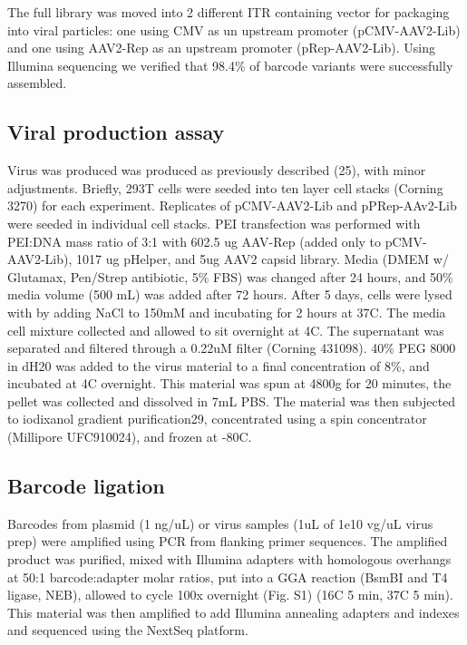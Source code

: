 The full library was moved into 2 different ITR containing vector for packaging into viral particles: one using CMV as un upstream promoter (pCMV-AAV2-Lib) and one using AAV2-Rep as an upstream promoter (pRep-AAV2-Lib). Using Illumina sequencing we verified that 98.4\% of barcode variants were successfully assembled.

\subsection{Viral production assay}
Virus was produced was produced as previously described (25), with minor adjustments. Briefly, 293T cells were seeded into ten layer cell stacks (Corning 3270) for each experiment. Replicates of pCMV-AAV2-Lib and pPRep-AAv2-Lib were seeded in individual cell stacks. PEI transfection was performed with PEI:DNA mass ratio of 3:1 with 602.5 ug AAV-Rep (added only to pCMV-AAV2-Lib), 1017 ug pHelper, and 5ug AAV2 capsid library. Media (DMEM w/ Glutamax, Pen/Strep antibiotic, 5\% FBS) was changed after 24 hours, and 50\% media volume (500 mL) was added after 72 hours. After 5 days, cells were lysed with by adding NaCl to 150mM and incubating for 2 hours at 37C. The media cell mixture collected and allowed to sit overnight at 4C. The supernatant was separated and filtered through a 0.22uM filter (Corning 431098). 40\% PEG 8000 in dH20 was added to the virus material to a final concentration of 8\%, and incubated at 4C overnight. This material was spun at 4800g for 20 minutes, the pellet was collected and dissolved in 7mL PBS. The material was then subjected to iodixanol gradient purification29, concentrated using a spin concentrator (Millipore UFC910024), and frozen at -80C. 

\subsection{Barcode ligation}
Barcodes from plasmid (1 ng/uL) or virus samples (1uL of 1e10 vg/uL virus prep) were amplified using PCR from flanking primer sequences. The amplified product was purified, mixed with Illumina adapters with homologous overhangs at 50:1 barcode:adapter molar ratios, put into a GGA reaction (BsmBI and T4 ligase, NEB), allowed to cycle 100x overnight (Fig. S1) (16C 5 min, 37C 5 min). This material was then amplified to add Illumina annealing adapters and indexes and sequenced using the NextSeq platform. 

